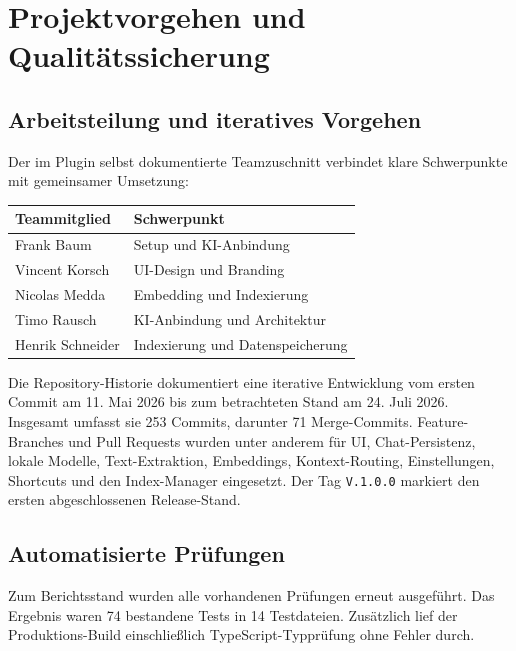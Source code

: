 \documentclass[11pt,a4paper,oneside,parskip=half]{scrartcl}
\begin{document}
\section{Projektvorgehen und Qualitätssicherung}

\subsection{Arbeitsteilung und iteratives Vorgehen}

Der im Plugin selbst dokumentierte Teamzuschnitt verbindet klare Schwerpunkte
mit gemeinsamer Umsetzung:

\noindent\begin{tabularx}{\linewidth}{@{}L{3.4cm}Y@{}}
\toprule
\textbf{Teammitglied} & \textbf{Schwerpunkt} \\
\midrule
Frank Baum & Setup und KI-Anbindung \\
Vincent Korsch & UI-Design und Branding \\
Nicolas Medda & Embedding und Indexierung \\
Timo Rausch & KI-Anbindung und Architektur \\
Henrik Schneider & Indexierung und Datenspeicherung \\
\bottomrule
\end{tabularx}

Die Repository-Historie dokumentiert eine iterative Entwicklung vom ersten
Commit am 11. Mai 2026 bis zum betrachteten Stand am 24. Juli 2026. Insgesamt
umfasst sie 253 Commits, darunter 71 Merge-Commits. Feature-Branches und Pull
Requests wurden unter anderem für UI, Chat-Persistenz, lokale Modelle,
Text-Extraktion, Embeddings, Kontext-Routing, Einstellungen, Shortcuts und den
Index-Manager eingesetzt. Der Tag \texttt{V.1.0.0} markiert den ersten
abgeschlossenen Release-Stand.

\subsection{Automatisierte Prüfungen}

Zum Berichtsstand wurden alle vorhandenen Prüfungen erneut ausgeführt. Das
Ergebnis waren 74 bestandene Tests in 14 Testdateien. Zusätzlich lief der
Produktions-Build einschließlich TypeScript-Typprüfung ohne Fehler durch.
\end{document}
